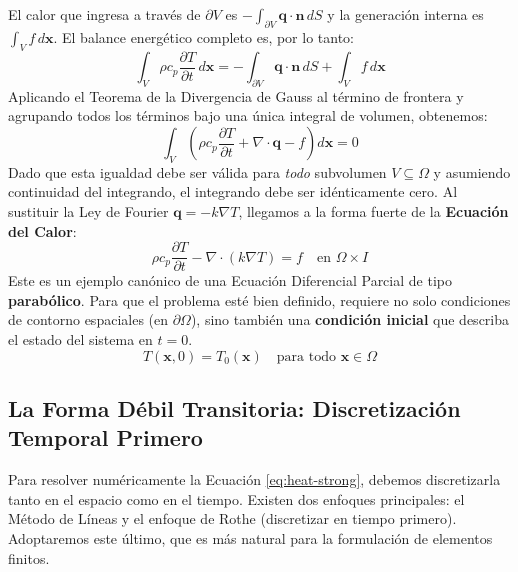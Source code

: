 El calor que ingresa a través de \(\partial V\) es \(-\int_{\partial V} \bm{q} \cdot \bm{n} \, dS\) y la generación interna es \(\int_V f \, d\bm{x}\). El balance energético completo es, por lo tanto:
\[
\int_V \rho c_p \frac{\partial T}{\partial t} \, d\bm{x} = -\int_{\partial V} \bm{q} \cdot \bm{n} \, dS + \int_V f \, d\bm{x}
\]
Aplicando el Teorema de la Divergencia de Gauss al término de frontera y agrupando todos los términos bajo una única integral de volumen, obtenemos:
\[
\int_V \left( \rho c_p \frac{\partial T}{\partial t} + \nabla \cdot \bm{q} - f \right) d\bm{x} = 0
\]
Dado que esta igualdad debe ser válida para \textit{todo} subvolumen \(V \subseteq \Omega\) y asumiendo continuidad del integrando, el integrando debe ser idénticamente cero. Al sustituir la Ley de Fourier \(\bm{q} = -k \nabla T\), llegamos a la forma fuerte de la \textbf{Ecuación del Calor}:
\begin{equation}
    \rho c_p \frac{\partial T}{\partial t} - \nabla \cdot (k \nabla T) = f \quad \text{en } \Omega \times I
    \label{eq:heat-strong}
\end{equation}
Este es un ejemplo canónico de una Ecuación Diferencial Parcial de tipo \textbf{parabólico}. Para que el problema esté bien definido, requiere no solo condiciones de contorno espaciales (en \(\partial\Omega\)), sino también una \textbf{condición inicial} que describa el estado del sistema en \(t=0\).
\[ T(\bm{x}, 0) = T_0(\bm{x}) \quad \text{para todo } \bm{x} \in \Omega \]

\subsection{La Forma Débil Transitoria: Discretización Temporal Primero}

Para resolver numéricamente la Ecuación \eqref{eq:heat-strong}, debemos discretizarla tanto en el espacio como en el tiempo. Existen dos enfoques principales: el Método de Líneas y el enfoque de Rothe (discretizar en tiempo primero). Adoptaremos este último, que es más natural para la formulación de elementos finitos.

